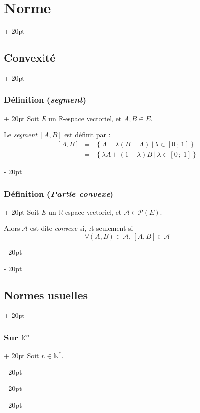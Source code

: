 \documentclass[a4paper, 12pt, twoside]{article}
\newcommand{\N}{\mathbb{N}} %
\newcommand{\R}{\mathbb{R}} %
\newcommand{\K}{\mathbb K}
\newcommand{\seg}[2]{\left[ #1\ ;\ #2 \right]}
\newcommand{\set}[1]{\left\{ #1 \right\}}
\newcommand{\ind}[1][20pt]{\advance\leftskip + #1}
\newcommand{\deind}[1][20pt]{\advance\leftskip - #1}
\newenvironment{indt}[2][20pt]{#2 \par \ind[#1]}{\par \deind} %
\begin{document}
\begin{indt}{\section{Norme}}
        \begin{indt}{\subsection{Convexité}}
            \begin{indt}{\subsubsection{Définition (\textit{segment})}}
                Soit $E$ un $\R$-espace vectoriel, et $A, B \in E$.
                
                Le \emph{segment} $[A, B]$ est définit par :
                \[
                    \begin{array}{rcl}
                        [A, B] &=& \set{A + \lambda(B - A) \ |\ \lambda \in \seg 0 1}
                        \\
                               &=& \set{\lambda A + (1 - \lambda)B\ |\ \lambda \in \seg 0 1}
                    \end{array}
                \]
            \end{indt}

            \vspace{12pt}
            
            \begin{indt}{\subsubsection{Définition (\textit{Partie convexe})}}
                Soit $E$ un $\R$-espace vectoriel, et $\mathcal A \in \mathcal P(E)$.

                Alors $\mathcal A$ est dite \emph{convexe} si, et seulement si
                \[
                    \forall (A, B) \in \mathcal A,\ [A, B] \in \mathcal A
                \]
            \end{indt}
        \end{indt}

        \vspace{12pt}
        
        \begin{indt}{\subsection{Normes usuelles}}
            \begin{indt}{\subsubsection{Sur $\K^n$}}
                Soit $n \in \N^*$.


\end{indt}
\end{indt}
\end{indt}
\end{document}
